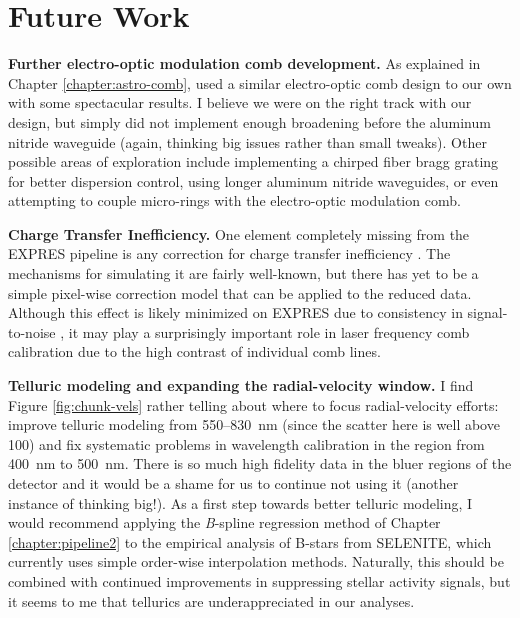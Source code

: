 \section{Future Work} \label{conclusion:future}

\textbf{Further electro-optic modulation comb development.} As explained in Chapter \ref{chapter:astro-comb}, \citet{obrzud_visible_2019} used a similar electro-optic comb design to our own with some spectacular results. I believe we were on the right track with our design, but simply did not implement enough broadening before the aluminum nitride waveguide (again, thinking big issues rather than small tweaks). Other possible areas of exploration include implementing a chirped fiber bragg grating for better dispersion control, using longer aluminum nitride waveguides, or even attempting to couple micro-rings with the electro-optic modulation comb.

\textbf{Charge Transfer Inefficiency.} One element completely missing from the EXPRES pipeline is any correction for charge transfer inefficiency \citep{goudfrooij_empirical_2006, bouchy_charge_2009, blake_impact_2017}. The mechanisms for simulating it are fairly well-known, but there has yet to be a simple pixel-wise correction model that can be applied to the reduced data. Although this effect is likely minimized on EXPRES due to consistency in signal-to-noise \citep{blackman_performance_2020}, it may play a surprisingly important role in laser frequency comb calibration due to the high contrast of individual comb lines.

\textbf{Telluric modeling and expanding the radial-velocity window.} I find Figure \ref{fig:chunk-vels} rather telling about where to focus radial-velocity efforts: improve telluric modeling from 550--830~\si{\nano\meter} (since the scatter here is well above 100\ms) and fix systematic problems in wavelength calibration in the region from 400~\si{\nano\meter} to 500~\si{\nano\meter}. There is so much high fidelity data in the bluer regions of the detector and it would be a shame for us to continue not using it (another instance of thinking big!). As a first step towards better telluric modeling, I would recommend applying the \textit{B}-spline regression method of Chapter \ref{chapter:pipeline2} to the empirical analysis of B-stars from SELENITE, which currently uses simple order-wise interpolation methods. Naturally, this should be combined with continued improvements in suppressing stellar activity signals, but it seems to me that tellurics are underappreciated in our analyses.

